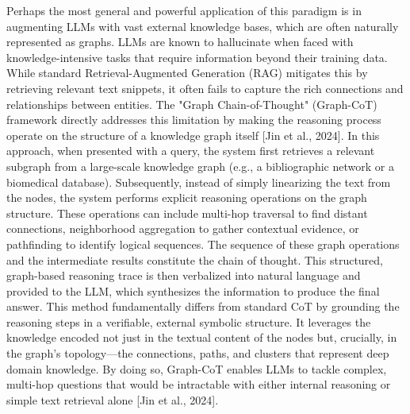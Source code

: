 \documentclass[11pt]{article}
\begin{document}
Perhaps the most general and powerful application of this paradigm is in augmenting LLMs with vast external knowledge bases, which are often naturally represented as graphs. LLMs are known to hallucinate when faced with knowledge-intensive tasks that require information beyond their training data. While standard Retrieval-Augmented Generation (RAG) mitigates this by retrieving relevant text snippets, it often fails to capture the rich connections and relationships between entities. The "Graph Chain-of-Thought" (Graph-CoT) framework directly addresses this limitation by making the reasoning process operate on the structure of a knowledge graph itself [Jin et al., 2024]. In this approach, when presented with a query, the system first retrieves a relevant subgraph from a large-scale knowledge graph (e.g., a bibliographic network or a biomedical database). Subsequently, instead of simply linearizing the text from the nodes, the system performs explicit reasoning operations on the graph structure. These operations can include multi-hop traversal to find distant connections, neighborhood aggregation to gather contextual evidence, or pathfinding to identify logical sequences. The sequence of these graph operations and the intermediate results constitute the chain of thought. This structured, graph-based reasoning trace is then verbalized into natural language and provided to the LLM, which synthesizes the information to produce the final answer. This method fundamentally differs from standard CoT by grounding the reasoning steps in a verifiable, external symbolic structure. It leverages the knowledge encoded not just in the textual content of the nodes but, crucially, in the graph's topology—the connections, paths, and clusters that represent deep domain knowledge. By doing so, Graph-CoT enables LLMs to tackle complex, multi-hop questions that would be intractable with either internal reasoning or simple text retrieval alone [Jin et al., 2024].
\end{document}
